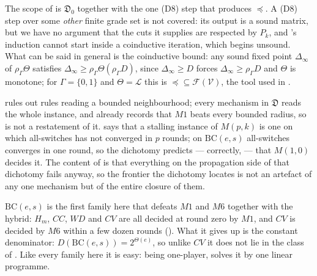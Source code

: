 \begin{remark}[Measured]
The scope of  is $\mathfrak D_0$ together with the one
\textup{(D8)} step that produces $\preceq$. A \textup{(D8)} step over
some \emph{other} finite grade set is not covered: its output is a sound
matrix, but we have no argument that the cuts it supplies are respected by
$P_k$, and 's induction cannot start inside a
coinductive iteration, which begins unsound. What can be said in general
is the coinductive bound: any sound fixed point $\Delta_\infty$ of
$\rho_\Gamma\Theta$ satisfies
$\Delta_\infty\ge\rho_\Gamma\Theta(\rho_\Gamma D)$, since
$\Delta_\infty\ge D$ forces $\Delta_\infty\ge\rho_\Gamma D$ and
$\Theta$ is monotone; for $\Gamma=\{0,1\}$ and $\Theta=\mathcal L$ this
is $\preceq\subseteq\mathcal F(\mathcal V)$, the tool used in
.
\end{remark}

\begin{remark}\label{ob:relate}
 rules out rules reading a bounded neighbourhood;
every mechanism in $\mathfrak D$ reads the whole instance, and
 already records that $M1$ beats every bounded
radius, so  is not a restatement of it.
 says that a stalling instance of $M(p,k)$ is one
on which all-switches has not converged in $p$ rounds; on
$\mathrm{BC}(e,s)$ all-switches converges in one round, so the dichotomy
predicts --- correctly,  --- that $M(1,0)$ decides it. The
content of  is that everything on the propagation side
of that dichotomy fails anyway, so the frontier the dichotomy locates is
not an artefact of any one mechanism but of the entire closure of them.

$\mathrm{BC}(e,s)$ is the first family here that defeats $M1$ and $M6$
together with the hybrid: $H_m$, $CC$, $WD$ and $CV$ are all decided at
round zero by $M1$, and $CV$ is decided by $M6$ within a few dozen rounds
(). What it gives up is the constant denominator:
$D(\mathrm{BC}(e,s))=2^{\Theta(e)}$, so unlike $CV$ it does not lie in the
class of . Like every family here it is easy:
being one-player,  solves it by one linear
programme.
\end{remark}